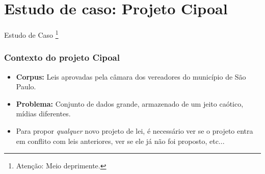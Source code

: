 \documentclass[11pt]{beamer}
\begin{document}
\section{Estudo de caso: Projeto Cipoal}
\begin{frame}
\begin{center}
	Estudo de Caso \footnote{Atenção: Meio deprimente.}
\end{center}
\end{frame}

\begin{frame}
\frametitle{Contexto do projeto Cipoal}
\begin{itemize}
	\item \textbf{Corpus: }Leis aprovadas pela câmara dos vereadores do município de São Paulo.\\
	\item \textbf{Problema: }Conjunto de dados grande, armazenado de um jeito caótico, mídias diferentes.\\
	\item Para propor \textit{qualquer} novo projeto de lei, é necessário ver se o projeto entra em conflito com leis anteriores, ver se ele já não foi proposto, etc...\\
\end{itemize}
\end{frame}
\end{document}
